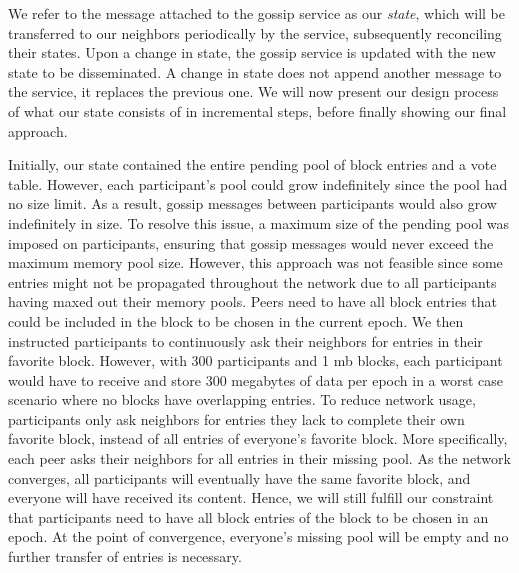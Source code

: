 \documentclass[USenglish]{uit-thesis}
\begin{document}
We refer to the message attached to the gossip service as our \textit{state}, which will be transferred to our neighbors periodically by the service, subsequently reconciling their states. 
Upon a change in state, the gossip service is updated with the new state to be disseminated.
A change in state does not append another message to the service, it replaces the previous one.
We will now present our design process of what our state consists of in incremental steps, before finally showing our final approach.

Initially, our state contained the entire pending pool of block entries and a vote table.
However, each participant's pool could grow indefinitely since the pool had no size limit.
As a result, gossip messages between participants would also grow indefinitely in size.
To resolve this issue, a maximum size of the pending pool was imposed on participants, ensuring that gossip messages would never exceed the maximum memory pool size.
However, this approach was not feasible since some entries might not be propagated throughout the network due to all participants having maxed out their memory pools.
Peers need to have all block entries that could be included in the block to be chosen in the current epoch.
We then instructed participants to continuously ask their neighbors for entries in their favorite block.
However, with 300 participants and 1 \gls{mb} blocks, each participant would have to receive and store 300 megabytes of data per epoch in a worst case scenario where no blocks have overlapping entries.
To reduce network usage, participants only ask neighbors for entries they lack to complete their own favorite block, instead of all entries of everyone's favorite block.
More specifically, each peer asks their neighbors for all entries in their missing pool.
As the network converges, all participants will eventually have the same favorite block, and everyone will have received its content.
Hence, we will still fulfill our constraint that participants need to have all block entries of the block to be chosen in an epoch.  
At the point of convergence, everyone's missing pool will be empty and no further transfer of entries is necessary.
\end{document}
